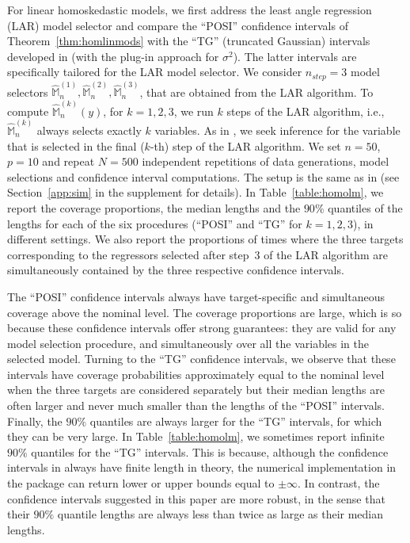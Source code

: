 \documentclass[preprint]{imsart}
\newcommand{\M}{\mathbb M}
\numberwithin{equation}{section}
\begin{document}
For linear homoskedastic models, we first address the least angle regression (LAR) model selector \cite{efron04least} and compare the ``POSI'' confidence intervals of Theorem~\ref{thm:homlinmods} with the ``TG'' (truncated Gaussian) intervals developed in \cite{Tib15a} (with the plug-in approach for $\sigma^2$). The latter intervals are specifically tailored for the LAR model selector. We consider $n_{step} = 3$ model selectors $\hat{\mathbb{M}}_n^{(1)},\hat{\mathbb{M}}_n^{(2)},\hat{\mathbb{M}}_n^{(3)}$, that are obtained from the LAR algorithm. To compute $\hat{\M}_n^{(k)}(y)$, for $k=1,2,3$, we run $k$ steps of the LAR algorithm, i.e., $\hat{\M}_n^{(k)}$ always selects exactly $k$ variables. As in \cite{Tib15a}, we seek inference for the variable that is selected in the final ($k$-th) step of the LAR algorithm. 
We set $n=50$, $p=10$ and repeat $N = 500$ independent repetitions of data generations, model selections and confidence interval computations. The setup is the same as in \cite{Tib15a} (see Section~\ref{app:sim} in the supplement for details). In Table~\ref{table:homolm}, we report the coverage proportions, the median lengths and the $90 \%$ quantiles of the lengths for each of the six procedures (``POSI'' and ``TG'' for $k=1,2,3$), in different settings. We also report the proportions of times where the three targets corresponding to the regressors selected after step~3 of the LAR algorithm are simultaneously contained by the three respective confidence intervals.

The ``POSI'' confidence intervals always have target-specific and simultaneous coverage above the nominal level. The coverage proportions are large, which is so because these confidence intervals offer strong guarantees: they are valid for any model selection procedure, and simultaneously over all the variables in the selected model. 
Turning to the ``TG'' confidence intervals, we observe that these intervals have coverage probabilities approximately equal to the nominal level when the three targets are considered separately but their median lengths are often larger and never much smaller than the lengths of the ``POSI'' intervals. 
Finally, the $90 \%$ quantiles are always larger for the ``TG'' intervals, for which they can be very large. In Table~\ref{table:homolm}, we sometimes report infinite $90 \%$ quantiles for the ``TG'' intervals. This is because, although the confidence intervals in \cite{Tib15a} always have finite length in theory, the numerical implementation in the \verb@R@ package \verb@selectiveInference@ can return lower or upper bounds equal to $\pm \infty$. In contrast, the confidence intervals suggested in this paper are more robust, in the sense that their $90 \%$ quantile lengths are always less than twice as large as their median lengths.
\end{document}
